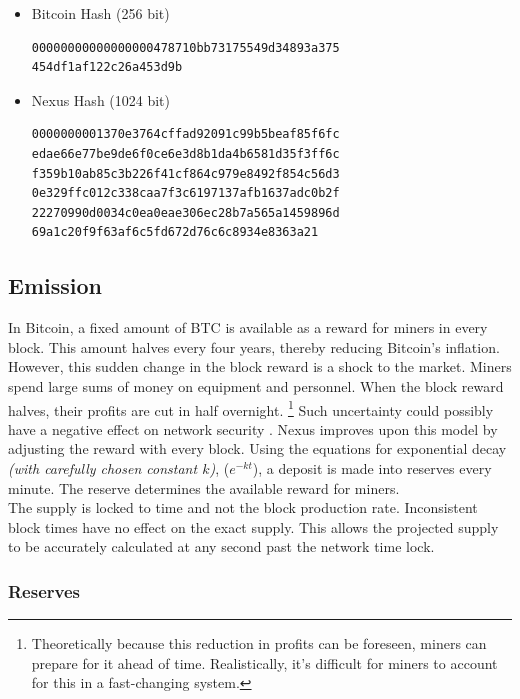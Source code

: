 \documentclass[11pt]{article}
\begin{document}
\begin{itemize}
\item Bitcoin Hash (256 bit)
\begin{lstlisting}
00000000000000000478710bb73175549d34893a375
454df1af122c26a453d9b
\end{lstlisting}

\item Nexus Hash (1024 bit)

\begin{lstlisting}
0000000001370e3764cffad92091c99b5beaf85f6fc
edae66e77be9de6f0ce6e3d8b1da4b6581d35f3ff6c
f359b10ab85c3b226f41cf864c979e8492f854c56d3
0e329ffc012c338caa7f3c6197137afb1637adc0b2f
22270990d0034c0ea0eae306ec28b7a565a1459896d
69a1c20f9f63af6c5fd672d76c6c8934e8363a21
\end{lstlisting}
\end{itemize}


\pagebreak
\subsection{Emission}

In Bitcoin, a fixed amount of BTC is available as a reward for miners in every block.
This amount halves every four years, thereby reducing Bitcoin's inflation.
However, this sudden change in the block reward is a shock to the market.
Miners spend large sums of money on equipment and personnel.
When the block reward halves, their profits are cut in half overnight.
\footnote{Theoretically because this reduction in profits can be foreseen, miners can prepare for it ahead of time.
Realistically, it's difficult for miners to account for this in a fast-changing system.}
Such uncertainty could possibly have a negative effect on network security \cite{cdhalving}.
\noindent Nexus improves upon this model by adjusting the reward with every block.
Using the equations for exponential decay \textit{(with carefully chosen constant $k$)}, ($e^{-kt}$), 
a deposit is made into reserves every minute.
The reserve determines the available reward for miners.\\ 

\noindent The supply is locked to time and not the block production rate. 
Inconsistent block times have no effect on the exact supply. 
This allows the projected supply to be accurately calculated at any second past the network time lock.

\subsubsection{Reserves}
\end{document}
